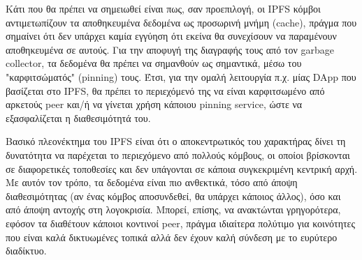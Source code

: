 Κάτι που θα πρέπει να σημειωθεί είναι πως, σαν προεπιλογή, οι IPFS κόμβοι αντιμετωπίζουν τα αποθηκευμένα δεδομένα ως προσωρινή μνήμη (cache), πράγμα που σημαίνει ότι δεν υπάρχει καμία εγγύηση ότι εκείνα θα συνεχίσουν να παραμένουν αποθηκευμένα σε αυτούς. Για την αποφυγή της διαγραφής τους από τον garbage collector, τα δεδομένα θα πρέπει να σημανθούν ως σημαντικά, μέσω του "καρφιτσώματός" (pinning) τους. Έτσι, για την ομαλή λειτουργία π.χ. μίας DApp που βασίζεται στο IPFS, θα πρέπει το περιεχόμενό της να είναι καρφιτσωμένο από αρκετούς peer και/ή να γίνεται χρήση κάποιου pinning service, ώστε να εξασφαλίζεται η διαθεσιμότητά του.

Βασικό πλεονέκτημα του IPFS είναι ότι ο αποκεντρωτικός του χαρακτήρας δίνει τη δυνατότητα να παρέχεται το περιεχόμενο από πολλούς κόμβους, οι οποίοι βρίσκονται σε διαφορετικές τοποθεσίες και δεν υπάγονται σε κάποια συγκεκριμένη κεντρική αρχή. Με αυτόν τον τρόπο, τα δεδομένα είναι πιο ανθεκτικά, τόσο από άποψη διαθεσιμότητας (αν ένας κόμβος αποσυνδεθεί, θα υπάρχει κάποιος άλλος), όσο και από άποψη αντοχής στη λογοκρισία. Μπορεί, επίσης, να ανακτώνται γρηγορότερα, εφόσον τα διαθέτουν κάποιοι κοντινοί peer, πράγμα ιδιαίτερα πολύτιμο για κοινότητες που είναι καλά δικτυωμένες τοπικά αλλά δεν έχουν καλή σύνδεση με το ευρύτερο διαδίκτυο.